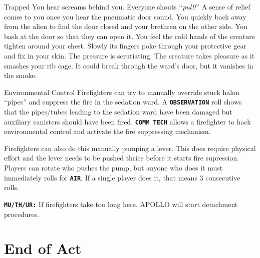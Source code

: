 \begin{rpg-warnbox}{Trapped}
   You hear screams behind you. Everyone shouts ``\textit{pull!}'' A sense of relief comes to you once you hear the pneumatic door sound. You quickly back away from the alien to find the door closed and your brethren on the other side. You bash at the door so that they can open it. You feel the cold hands of the creature tighten around your chest. Slowly its fingers poke through your protective gear and fix in your skin. The pressure is scrutiating. The creature takes pleasure as it smashes your rib cage. It could break through the ward's door, but it vanishes in the smoke.
\end{rpg-warnbox}


\clearpage

\begin{rpg-commentbox}{Environmental Control}
   Firefighters can try to manually override stuck halon ``pipes'' and suppress the fire in the sedation ward. 
   A \texttt{\textbf{OBSERVATION}} roll shows that the pipes/tubes leading to the sedation ward have been damaged but auxiliary canisters should have been fired.
   \texttt{\textbf{COMM TECH}} allows a firefighter to hack environmental control and activate the fire suppressing mechanism. 

   Firefighters can also do this manually pumping a lever. This does require  physical effort and the lever needs to be pushed thrice before it starts fire supression. Players can rotate who pushes the pump, but anyone who does it must immediately rolls for \texttt{\textbf{AIR}}. If a single player does it, that means 3 consecutive rolls.

   \texttt{\textbf{MU/TH/UR:}} If firefighters take too long here. APOLLO will start detachment procedures.
\end{rpg-commentbox} 


\section{End of Act}

